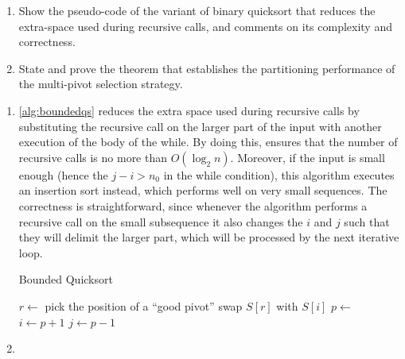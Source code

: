 \exercise

\begin{enumerate}

  \item Show the pseudo-code of the variant of binary quicksort that reduces the
  extra-space used during recursive calls, and comments on its complexity and
  correctness.

  \item State and prove the theorem that establishes the partitioning
  performance of the multi-pivot selection strategy.

\end{enumerate}

\solution

\begin{enumerate}

  \item \autoref{alg:boundedqs} reduces the extra space used during recursive
  calls by substituting the recursive call on the larger part of the input with
  another execution of the body of the while. By doing this, ensures that the
  number of recursive calls is no more than $O(\log_2 n)$. Moreover, if the
  input is small enough (hence the $j - i > n_0$ in the while condition), this
  algorithm executes an insertion sort instead, which performs well on very
  small sequences. The correctness is straightforward, since whenever the
  algorithm performs a recursive call on the small subsequence it also changes
  the $i$ and $j$ such that they will delimit the larger part, which will be
  processed by the next iterative loop.
  \begin{algorithm}[tb]
  \caption{Bounded Quicksort}\label{alg:boundedqs}
  \begin{algorithmic}[1]
      \State $r \gets$ pick the position of a ``good pivot''
      \State swap $S[r]$ with $S[i]$
      \State $p \gets$ 
        \State {}
        \State $i \gets p + 1$
      \Else
        \State {}
        \State $j \gets p - 1$
      \EndIf
    \EndWhile
    \State {}
  \EndProcedure
  \end{algorithmic}
  \end{algorithm}

  \item \begin{description}


\end{description}
\end{enumerate}
